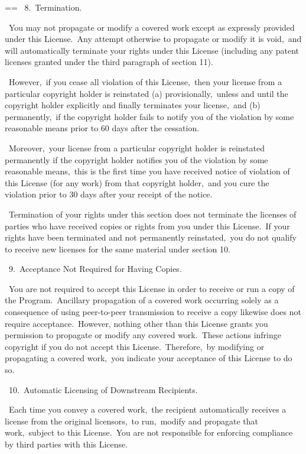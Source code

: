 \documentclass{book}
\makeatletter
\newenvironment{Texinfopreformatted}{%
  \par\GNUTobeylines\obeyspaces\frenchspacing\parskip=\z@\parindent=\z@}{}
{\catcode`\^^M=13 \gdef\GNUTobeylines{\catcode`\^^M=13 \def^^M{\null\par}}}
\newenvironment{Texinfoindented}{\begin{list}{}{}\item\relax}{\end{list}}
\renewcommand{\_}{\Texinfounderscore\discretionary{}{}{}}
\makeatother
\begin{document}
\begin{Texinfoindented}
\begin{Texinfopreformatted}
\  8.\ Termination.

\  You may not propagate or modify a covered work except as expressly
provided under this License.\  Any attempt otherwise to propagate or
modify it is void,\ and will automatically terminate your rights under
this License (including any patent licenses granted under the third
paragraph of section 11).

\  However,\ if you cease all violation of this License,\ then your
license from a particular copyright holder is reinstated (a)
provisionally,\ unless and until the copyright holder explicitly and
finally terminates your license,\ and (b) permanently,\ if the copyright
holder fails to notify you of the violation by some reasonable means
prior to 60 days after the cessation.

\  Moreover,\ your license from a particular copyright holder is
reinstated permanently if the copyright holder notifies you of the
violation by some reasonable means,\ this is the first time you have
received notice of violation of this License (for any work) from that
copyright holder,\ and you cure the violation prior to 30 days after
your receipt of the notice.

\  Termination of your rights under this section does not terminate the
licenses of parties who have received copies or rights from you under
this License.\  If your rights have been terminated and not permanently
reinstated,\ you do not qualify to receive new licenses for the same
material under section 10.

\  9.\ Acceptance Not Required for Having Copies.

\  You are not required to accept this License in order to receive or
run a copy of the Program.\  Ancillary propagation of a covered work
occurring solely as a consequence of using peer-to-peer transmission
to receive a copy likewise does not require acceptance.\  However,
nothing other than this License grants you permission to propagate or
modify any covered work.\  These actions infringe copyright if you do
not accept this License.\  Therefore,\ by modifying or propagating a
covered work,\ you indicate your acceptance of this License to do so.

\  10.\ Automatic Licensing of Downstream Recipients.

\  Each time you convey a covered work,\ the recipient automatically
receives a license from the original licensors,\ to run,\ modify and
propagate that work,\ subject to this License.\  You are not responsible
for enforcing compliance by third parties with this License.


\end{Texinfopreformatted}
\end{Texinfoindented}
\end{document}
